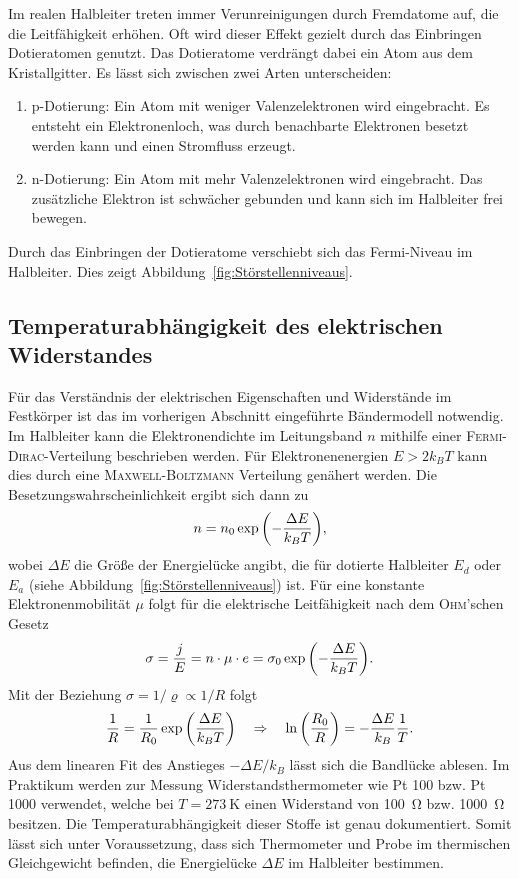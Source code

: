 \documentclass[parskip=half, a4paper,twoside,final]{article}
\begin{document}
Im realen Halbleiter treten immer Verunreinigungen durch Fremdatome auf, die die Leitfähigkeit erhöhen. Oft wird dieser Effekt gezielt durch das Einbringen Dotieratomen genutzt. Das Dotieratome verdrängt dabei ein Atom aus dem Kristallgitter. Es lässt sich zwischen zwei Arten unterscheiden:
\begin{enumerate}
  \item p-Dotierung: Ein Atom mit weniger Valenzelektronen wird eingebracht. Es entsteht ein Elektronenloch, was durch benachbarte Elektronen besetzt werden kann und einen Stromfluss erzeugt.
  \item n-Dotierung: Ein Atom mit mehr Valenzelektronen wird eingebracht. Das zusätzliche Elektron ist schwächer gebunden und kann sich im Halbleiter frei bewegen.
\end{enumerate}

Durch das Einbringen der Dotieratome verschiebt sich das Fermi-Niveau im Halbleiter. Dies zeigt Abbildung~\ref{fig:Störstellenniveaus}.


\subsection{Temperaturabhängigkeit des elektrischen Widerstandes}\label{sec:Widerstand}
Für das Verständnis der elektrischen Eigenschaften und Widerstände im Festkörper ist das im vorherigen Abschnitt eingeführte Bändermodell notwendig. Im Halbleiter kann die Elektronendichte im Leitungsband $n$ mithilfe einer \textsc{Fermi-Dirac}-Verteilung beschrieben werden. Für Elektronenenergien $E > 2k_B T$ kann dies durch eine \textsc{Maxwell-Boltzmann} Verteilung genähert werden. Die Besetzungswahrscheinlichkeit ergibt sich dann zu~\cite{Thurk}
\begin{align}
  n = n_0 \exp\qty(-\frac{\Delta E}{k_B T}),
\end{align}
wobei $\Delta E$ die Größe der Energielücke angibt, die für dotierte Halbleiter $E_d$ oder $E_a$ (siehe Abbildung~\ref{fig:Störstellenniveaus}) ist.
Für eine konstante Elektronenmobilität $\mu$ folgt für die elektrische Leitfähigkeit nach dem \textsc{Ohm}'schen Gesetz~\cite{Thurk}
\begin{align}
  \sigma = \frac{j}{E} = n \cdot \mu \cdot e = \sigma_0 \exp\qty(-\frac{\Delta E}{k_B T}).
\end{align}
Mit der Beziehung $\sigma = 1/\varrho \propto 1/R$ folgt
\begin{align}\label{eqn:Anstieg_Bandlücke}
  \frac{1}{R} = \frac{1}{R_0} \exp\qty(\frac{\Delta E}{k_B T}) \quad \Rightarrow \quad \ln\qty(\frac{R_0}{R}) = -\frac{\Delta E}{k_B}\frac{1}{T}.
\end{align}
Aus dem linearen Fit des Anstieges $-\Delta E/k_B$ lässt sich die Bandlücke ablesen. Im Praktikum werden zur Messung Widerstandsthermometer wie Pt 100 bzw. Pt 1000 verwendet, welche bei $T = \SI{273}{\kelvin}$ einen Widerstand von \SI{100}{\ohm} bzw. \SI{1000}{\ohm} besitzen. Die Temperaturabhängigkeit dieser Stoffe ist genau dokumentiert. Somit lässt sich unter Voraussetzung, dass sich Thermometer und Probe im thermischen Gleichgewicht befinden, die Energielücke $\Delta E$ im Halbleiter bestimmen.
\end{document}
